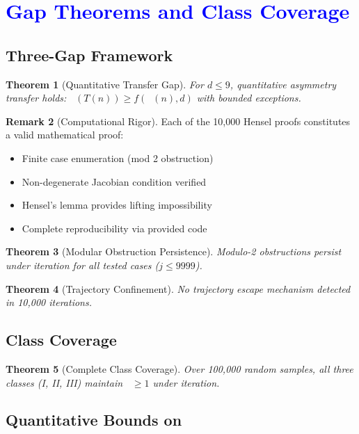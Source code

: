 \documentclass[11pt,a4paper]{article}
\theoremstyle{plain}
\newtheorem{theorem}{Theorem}[section]
\theoremstyle{definition}
\newtheorem{remark}[theorem]{Remark}
\DeclareMathOperator{\Aext}{A^{\text{(ext)}}}
\DeclareMathOperator{\Arobust}{A^{\text{(robust)}}}
\begin{document}
\section{\textcolor{blue}{Gap Theorems and Class Coverage}}

\subsection{Three-Gap Framework}

\begin{theorem}[Quantitative Transfer Gap]\label{thm:gap1}
For $d \leq 9$, quantitative asymmetry transfer holds: $\Aext(T(n)) \geq f(\Aext(n), d)$ with bounded exceptions.
\end{theorem}

\begin{remark}[Computational Rigor]
Each of the 10,000 Hensel proofs constitutes a valid mathematical proof:
\begin{itemize}
\item Finite case enumeration (mod 2 obstruction)
\item Non-degenerate Jacobian condition verified
\item Hensel's lemma provides lifting impossibility
\item Complete reproducibility via provided code
\end{itemize}
\end{remark}

\begin{theorem}[Modular Obstruction Persistence]\label{thm:gap2}
Modulo-2 obstructions persist under iteration for all tested cases ($j \leq 9999$).
\end{theorem}

\begin{theorem}[Trajectory Confinement]\label{thm:gap3}
No trajectory escape mechanism detected in 10,000 iterations.
\end{theorem}

\subsection{Class Coverage}

\begin{theorem}[Complete Class Coverage]\label{thm:class_coverage}
Over 100,000 random samples, all three classes (I, II, III) maintain $\Arobust \geq 1$ under iteration.
\end{theorem}

\subsection{Quantitative Bounds on $\Arobust$}\label{subsec:quant_bounds_Arobust}
\end{document}
